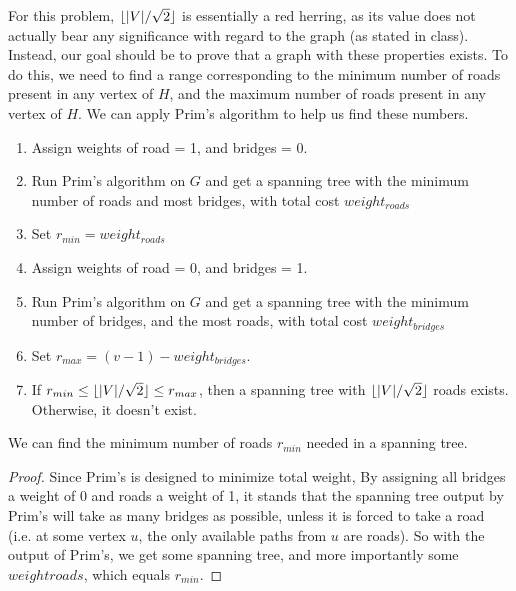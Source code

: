 \documentclass[11pt]{article}
\DeclarePairedDelimiter\floor{\lfloor}{\rfloor}
\begin{document}
 For this problem, $\floor{|V|/\sqrt{2}}$ is essentially a red herring, as its value does not actually bear any significance with regard to the graph (as stated in class). Instead, our goal should be to prove that a graph with these properties exists. To do this, we need to find a range corresponding to the minimum number of roads present in any vertex of $H$, and the maximum number of roads present in any vertex of $H$. We can apply Prim's algorithm to help us find these numbers.
 
 
 \begin{algo*}
 \begin{enumerate}
 \item Assign weights of road = 1, and bridges = 0.
 \item Run Prim's algorithm on $G$ and get a spanning tree with the minimum number of roads and most bridges, with total cost $weight_{roads}$
 \item Set $r_{min} = weight_{roads}$
 \item Assign weights of road = 0, and bridges = 1.
 \item Run Prim's algorithm on $G$ and get a spanning tree with the minimum number of bridges, and the most roads, with total cost $weight_{bridges}$
 \item Set $r_{max} = (v-1) - weight_{bridges}$.
 \item If $r_{min} \leq \floor{|V|/\sqrt{2}} \leq r_{max}$, then a spanning tree with $\floor{|V|/\sqrt{2}}$ roads exists. Otherwise, it doesn't exist.
 \end{enumerate}
 \end{algo*}
 
 \begin{claim*} We can find the minimum number of roads $r_{min}$ needed in a spanning tree.\end{claim*}
 \begin{proof} Since Prim's is designed to minimize total weight, By assigning all bridges a weight of 0 and roads a weight of 1, it stands that the spanning tree output by Prim's will take as many bridges as possible, unless it is forced to take a road (i.e. at some vertex $u$, the only available paths from $u$ are roads). So with the output of Prim's, we get some spanning tree, and more importantly some $weight{roads}$, which equals $r_{min}$.
\end{proof}
\end{document}
